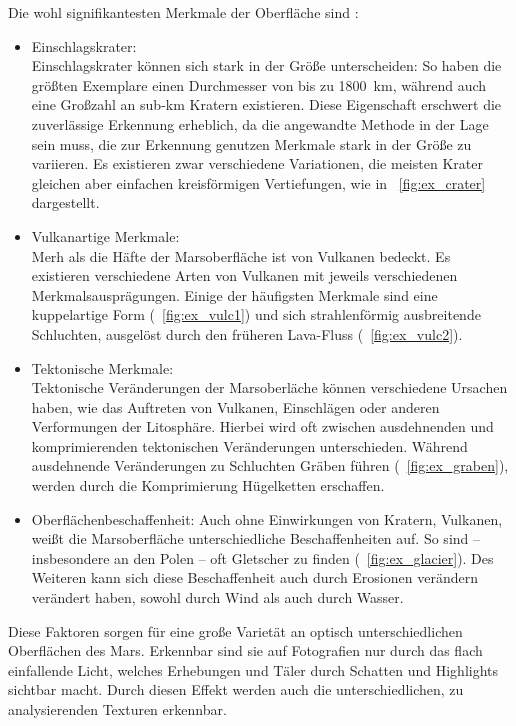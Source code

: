 Die wohl signifikantesten Merkmale der Oberfläche sind \ua: \cite[Kap.~7]{greeley_13}
\begin{itemize}
	\item Einschlagskrater:\\
Einschlagskrater können sich stark in der Größe unterscheiden: So haben die größten Exemplare einen Durchmesser von bis zu \SI{1800}{\kilo\meter}, während auch eine Großzahl an sub-\si{\kilo\meter} Kratern existieren. Diese Eigenschaft erschwert die zuverlässige Erkennung erheblich, da die angewandte Methode in der Lage sein muss, die zur Erkennung genutzen Merkmale stark in der Größe zu variieren. Es existieren zwar verschiedene Variationen, die meisten Krater gleichen aber einfachen kreisförmigen Vertiefungen, wie in \figurename~\ref{fig:ex_crater} dargestellt.
	\item Vulkanartige Merkmale:\\
Merh als die Häfte der Marsoberfläche ist von Vulkanen bedeckt. \cite[Kap.~7]{greeley_13} Es existieren verschiedene Arten von Vulkanen mit jeweils verschiedenen Merkmalsausprägungen. Einige der häufigsten Merkmale sind eine kuppelartige Form (\vgl \figurename~\ref{fig:ex_vulc1}) und sich strahlenförmig ausbreitende Schluchten, ausgelöst durch den früheren Lava-Fluss (\vgl \figurename~\ref{fig:ex_vulc2}). \cite[Kap.~7]{greeley_13}
	\item Tektonische Merkmale:\\
Tektonische Veränderungen der Marsoberläche können verschiedene Ursachen haben, wie \zB das Auftreten von Vulkanen, Einschlägen oder anderen Verformungen der Litosphäre. \cite[Kap.~7]{greeley_13} Hierbei wird oft zwischen ausdehnenden und komprimierenden tektonischen Veränderungen unterschieden. Während ausdehnende Veränderungen zu Schluchten \bzw Gräben führen (\vgl \figurename~\ref{fig:ex_graben}), werden durch die Komprimierung Hügelketten erschaffen.
	\item Oberflächenbeschaffenheit:
Auch ohne Einwirkungen von Kratern, Vulkanen, \etc weißt die Marsoberfläche unterschiedliche Beschaffenheiten auf. So sind -- insbesondere an den Polen -- oft Gletscher zu finden (\vgl \figurename~\ref{fig:ex_glacier}). Des Weiteren kann sich diese Beschaffenheit auch durch Erosionen verändern \bzw verändert haben, sowohl durch Wind als auch durch Wasser.
\end{itemize}

Diese Faktoren sorgen für eine große Varietät an optisch unterschiedlichen Oberflächen des Mars. Erkennbar sind sie auf Fotografien nur durch das flach einfallende Licht, welches Erhebungen und Täler durch Schatten und Highlights sichtbar macht. Durch diesen Effekt werden auch die unterschiedlichen, zu analysierenden Texturen erkennbar.

